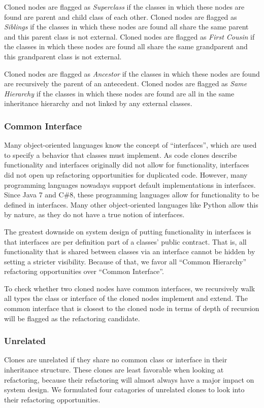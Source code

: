 Cloned nodes are flagged as \textit{Superclass} if the classes in which these nodes are found are parent and child class of each other. Cloned nodes are flagged as \textit{Siblings} if the classes in which these nodes are found all share the same parent and this parent class is not external. Cloned nodes are flagged as \textit{First Cousin} if the classes in which these nodes are found all share the same grandparent and this grandparent class is not external.

Cloned nodes are flagged as \textit{Ancestor} if the classes in which these nodes are found are recursively the parent of an antecedent. Cloned nodes are flagged as \textit{Same Hierarchy} if the classes in which these nodes are found are all in the same inheritance hierarchy and not linked by any external classes.

\subsubsection{Common Interface}
Many object-oriented languages know the concept of ``interfaces'', which are used to specify a behavior that classes must implement. As code clones describe functionality and interfaces originally did not allow for functionality, interfaces did not open up refactoring opportunities for duplicated code. However, many programming languages nowadays support default implementations in interfaces. Since Java 7 and C\#8, these programming languages allow for functionality to be defined in interfaces. Many other object-oriented languages like Python allow this by nature, as they do not have a true notion of interfaces.

The greatest downside on system design of putting functionality in interfaces is that interfaces are per definition part of a classes' public contract. That is, all functionality that is shared between classes via an interface cannot be hidden by setting a stricter visibility. Because of that, we favor all ``Common Hierarchy'' refactoring opportunities over ``Common Interface''.

To check whether two cloned nodes have common interfaces, we recursively walk all types the class or interface of the cloned nodes implement and extend. The common interface that is closest to the cloned node in terms of depth of recursion will be flagged as the refactoring candidate.

\subsubsection{Unrelated}
Clones are unrelated if they share no common class or interface in their inheritance structure. These clones are least favorable when looking at refactoring, because their refactoring will almost always have a major impact on system design. We formulated four catagories of unrelated clones to look into their refactoring opportunities.

